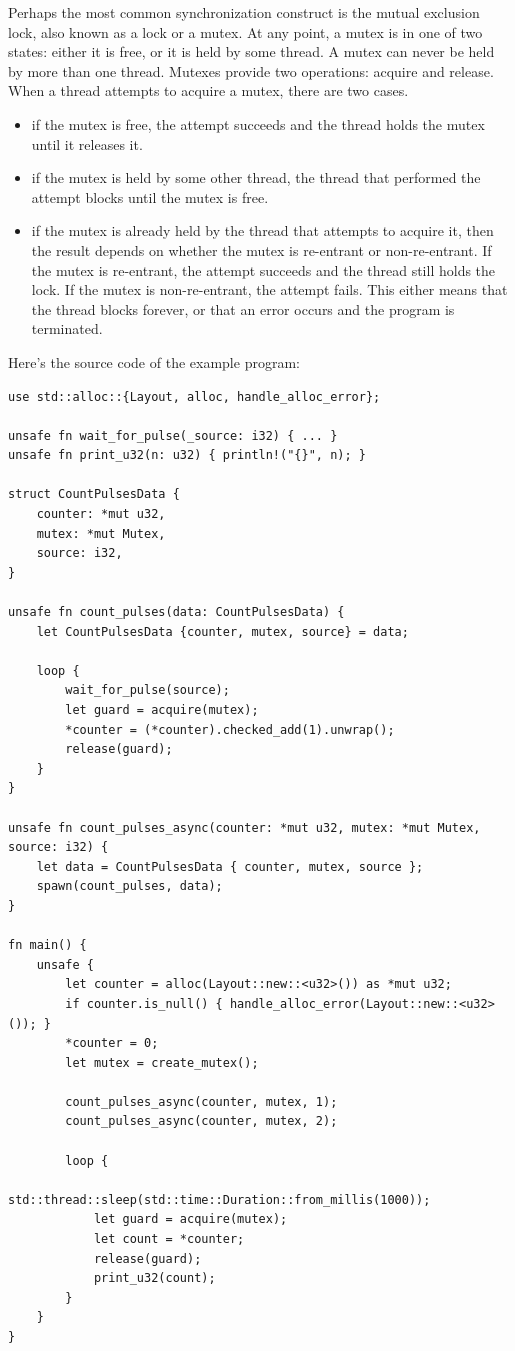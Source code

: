 \documentclass{article}
\begin{document}
Perhaps the most common synchronization construct is the mutual
exclusion lock, also known as a lock or a mutex. At any point,
a mutex is in one of two states: either it is free, or it is
held by some thread. A mutex can never be held by more than one
thread. Mutexes provide two operations: acquire and release.
When a thread attempts to acquire a mutex, there are two cases.
\begin{itemize}
\item if the mutex is free, the attempt succeeds and the
    thread holds the mutex until it releases it.
\item if the mutex is held by some other thread, the thread
    that performed the attempt blocks until the mutex is
    free.
\item if the mutex is already held by the thread that
    attempts to acquire it, then the result depends on
    whether the mutex is re-entrant or non-re-entrant. If
    the mutex is re-entrant, the attempt succeeds and the
    thread still holds the lock. If the mutex is
    non-re-entrant, the attempt fails. This either means
    that the thread blocks forever, or that an error occurs
    and the program is terminated.
\end{itemize}

Here's the source code of the example program:
\begin{lstlisting}
use std::alloc::{Layout, alloc, handle_alloc_error};

unsafe fn wait_for_pulse(_source: i32) { ... }
unsafe fn print_u32(n: u32) { println!("{}", n); }

struct CountPulsesData {
    counter: *mut u32,
    mutex: *mut Mutex,
    source: i32,
}

unsafe fn count_pulses(data: CountPulsesData) {
    let CountPulsesData {counter, mutex, source} = data;

    loop {
        wait_for_pulse(source);
        let guard = acquire(mutex);
        *counter = (*counter).checked_add(1).unwrap();
        release(guard);
    }
}

unsafe fn count_pulses_async(counter: *mut u32, mutex: *mut Mutex, source: i32) {
    let data = CountPulsesData { counter, mutex, source };
    spawn(count_pulses, data);
}

fn main() {
    unsafe {
        let counter = alloc(Layout::new::<u32>()) as *mut u32;
        if counter.is_null() { handle_alloc_error(Layout::new::<u32>()); }
        *counter = 0;
        let mutex = create_mutex();

        count_pulses_async(counter, mutex, 1);
        count_pulses_async(counter, mutex, 2);

        loop {
            std::thread::sleep(std::time::Duration::from_millis(1000));
            let guard = acquire(mutex);
            let count = *counter;
            release(guard);
            print_u32(count);
        }
    }
}
\end{lstlisting}
\end{document}
